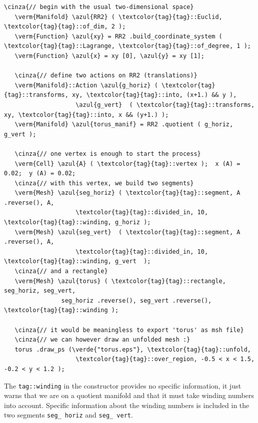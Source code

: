 \begin{Verbatim}[commandchars=\\\{\},formatcom=\small\tt,frame=single,
   label=parag-\ref{\numb section 7.\numb parag 4}.cpp,rulecolor=\color{coment},
   baselinestretch=0.94,framesep=2mm                                            ]
   \cinza{// begin with the usual two-dimensional space}
   \verm{Manifold} \azul{RR2} ( \textcolor{tag}{tag}::Euclid, \textcolor{tag}{tag}::of_dim, 2 );
   \verm{Function} \azul{xy} = RR2 .build_coordinate_system ( \textcolor{tag}{tag}::Lagrange, \textcolor{tag}{tag}::of_degree, 1 );
   \verm{Function} \azul{x} = xy [0], \azul{y} = xy [1];

   \cinza{// define two actions on RR2 (translations)}
   \verm{Manifold}::Action \azul{g_horiz} ( \textcolor{tag}{tag}::transforms, xy, \textcolor{tag}{tag}::into, (x+1.) && y ),
                    \azul{g_vert}  ( \textcolor{tag}{tag}::transforms, xy, \textcolor{tag}{tag}::into, x && (y+1.) );
   \verm{Manifold} \azul{torus_manif} = RR2 .quotient ( g_horiz, g_vert );

   \cinza{// one vertex is enough to start the process}
   \verm{Cell} \azul{A} ( \textcolor{tag}{tag}::vertex );  x (A) = 0.02;  y (A) = 0.02;
   \cinza{// with this vertex, we build two segments}
   \verm{Mesh} \azul{seg_horiz} ( \textcolor{tag}{tag}::segment, A .reverse(), A,
                    \textcolor{tag}{tag}::divided_in, 10, \textcolor{tag}{tag}::winding, g_horiz );
   \verm{Mesh} \azul{seg_vert}  ( \textcolor{tag}{tag}::segment, A .reverse(), A,
                    \textcolor{tag}{tag}::divided_in, 10, \textcolor{tag}{tag}::winding, g_vert  );
   \cinza{// and a rectangle}
   \verm{Mesh} \azul{torus} ( \textcolor{tag}{tag}::rectangle, seg_horiz, seg_vert,
                seg_horiz .reverse(), seg_vert .reverse(), \textcolor{tag}{tag}::winding );

   \cinza{// it would be meaningless to export 'torus' as msh file}
   \cinza{// we can however draw an unfolded mesh :}
   torus .draw_ps (\verde{"torus.eps"}, \textcolor{tag}{tag}::unfold,
                    \textcolor{tag}{tag}::over_region, -0.5 < x < 1.5, -0.2 < y < 1.2 );
\end{Verbatim}

The {\small\tt\textcolor{tag}{tag}::winding} in the constructor {\small\tt{}}
{\small\tt{}} provides no specific information, it just warns {\maniFEM} that
we are on a quotient manifold and that it must take winding numbers into account.
Specific information about the winding numbers is included in the two segments
{\small\tt seg\_\,horiz} and {\small\tt seg\_\,vert}.

